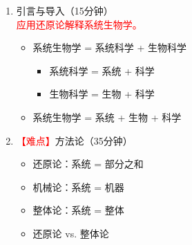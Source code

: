 \documentclass{TIJMUjiaoanLL}
\begin{document}
\begin{enumerate}
  \item 引言与导入（15分钟）\\
    \textcolor{red}{应用还原论解释系统生物学。}
    \begin{itemize}
      \item 系统生物学 = 系统科学 + 生物科学
        \begin{itemize}
          \item 系统科学 = 系统 + 科学
          \item 生物科学 = 生物 + 科学
        \end{itemize}
      \item 系统生物学 = 系统 + 生物 + 科学
    \end{itemize}

  \item \textcolor{red}{【难点】}方法论（35分钟）
    \begin{itemize}
      \item 还原论：系统 = 部分之和
      \item 机械论：系统 = 机器
      \item 整体论：系统 = 整体
      \item 还原论 vs. 整体论
    \end{itemize}


\end{enumerate}
\end{document}
